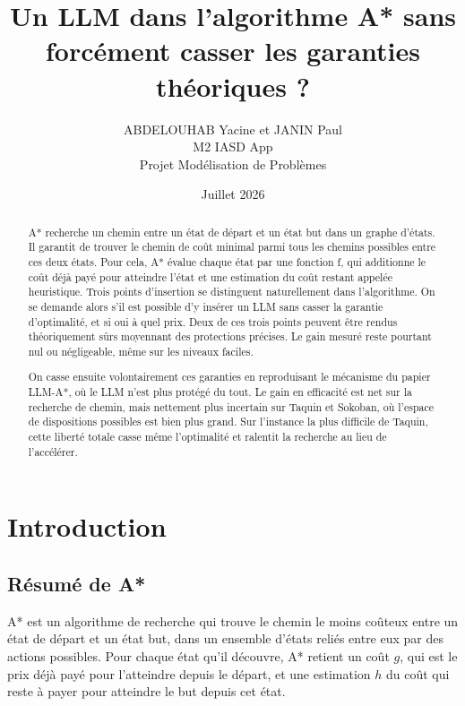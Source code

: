 \documentclass[11pt,a4paper]{article}
\title{Un LLM dans l'algorithme A* sans forcément casser les garanties théoriques ?}
\author{ABDELOUHAB Yacine et JANIN Paul \\ M2 IASD App \\ Projet Modélisation de Problèmes}
\date{Juillet 2026}
\begin{document}
\maketitle

\vfill
\begin{abstract}
\begin{center}
\begin{minipage}{0.85\textwidth}
\setlength{\parindent}{2em}

A* recherche un chemin entre un état de départ et un état but dans un graphe d'états. Il garantit de trouver le chemin de coût minimal parmi tous les chemins possibles entre ces deux états. Pour cela, A* évalue chaque état par une fonction f, qui additionne le coût déjà payé pour atteindre l'état et une estimation du coût restant appelée heuristique. Trois points d'insertion se distinguent naturellement dans l'algorithme. On se demande alors s'il est possible d'y insérer un LLM sans casser la garantie d'optimalité, et si oui à quel prix. Deux de ces trois points peuvent être rendus théoriquement sûrs moyennant des protections précises. Le gain mesuré reste pourtant nul ou négligeable, même sur les niveaux faciles.

On casse ensuite volontairement ces garanties en reproduisant le
mécanisme du papier LLM-A*, où le LLM n'est plus protégé du tout. Le
gain en efficacité est net sur la recherche de chemin, mais nettement
plus incertain sur Taquin et Sokoban, où l'espace de dispositions
possibles est bien plus grand. Sur l'instance la plus difficile de
Taquin, cette liberté totale casse même l'optimalité et ralentit la
recherche au lieu de l'accélérer.
\end{minipage}
\end{center}
\end{abstract}
\vfill

\newpage
\begingroup
\setlength{\parskip}{0pt}
\tableofcontents
\endgroup
\newpage

\section{Introduction}

\subsection{Résumé de A*}

A* est un algorithme de recherche qui trouve le chemin le moins coûteux entre un état de départ et un état but, dans un ensemble d'états reliés entre eux par des actions possibles. Pour chaque état qu'il découvre, A* retient un coût $g$, qui est le prix déjà payé pour l'atteindre depuis le départ, et une estimation $h$ du coût qui reste à payer pour atteindre le but depuis cet état.
\end{document}
